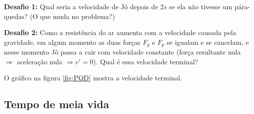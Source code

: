 \documentclass[a4paper]{article}
\begin{document}
\hrulefill

{\bf Desafio 1:} Qual seria a velocidade de Jô depois de $2s$ se ela
não tivesse um pára-quedas? (O que muda no problema?)

\hrulefill

{\bf Desafio 2:} Como a resistência do ar aumenta com a velocidade
causada pela gravidade, em algum momento as duas forças $F_g$ e $F_p$
se igualam e se cancelam, e nesse momento Jô passa a cair com
velocidade constante (força resultante nula $\Rightarrow$ aceleração
nula $\Rightarrow v'=0$). Qual é essa velocidade terminal?

O gráfico na figura \ref{fig:PQD} mostra a velocidade terminal.

\subsection{Tempo de meia vida}
\end{document}
